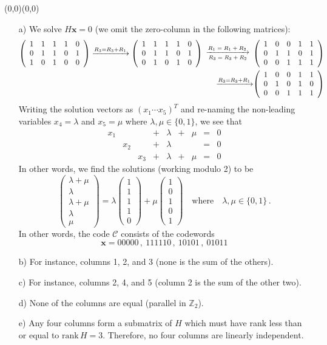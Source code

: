 \documentclass[11pt]{article}
\renewcommand{\vec}[1]{\mathbf{#1}}
\newcommand{\vc}[1]{\begin{pmatrix}#1\end{pmatrix}}
\newcommand{\pmat}[1]{{\left(\begin{array}{rrrrr}#1\end{array}\right)}}
\newcommand{\moveup}{\begin{picture}(0,0)(0,0)\end{picture}\vspace*{-8.15mm}}
\newcommand{\ra}[1]{\xrightarrow{#1}}
\newcommand{\dra}[2]{\begin{array}{c}\xrightarrow{\text{\scriptsize$#1$}}\\[-2mm]{\text{\scriptsize$#2$}}\end{array}}
\begin{document}
\bigskip
{}\moveup
\begin{itemize}
  \item[{a)}] We solve $H\vec{x} = 0$ (we omit the zero-column in the following matrices):
   \begin{align*}
    \pmat{
     1 & 1 & 1 & 1 & 0\\
     0 & 1 & 1 & 0 & 1\\
     1 & 0 & 1 & 0 & 0}
    \ra{R_3 = R_3 + R_1}
    \pmat{
     1 & 1 & 1 & 1 & 0\\
     0 & 1 & 1 & 0 & 1\\
     0 & 1 & 0 & 1 & 0}
    \dra{R_1 = R_1 + R_2}{R_3 = R_3 + R_2}
   &\pmat{
     1 & 0 & 0 & 1 & 1\\
     0 & 1 & 1 & 0 & 1\\
     0 & 0 & 1 & 1 & 1}\\
    \ra{R_3 = R_3 + R_1}
   &\pmat{
     1 & 0 & 0 & 1 & 1\\
     0 & 1 & 0 & 1 & 0\\
     0 & 0 & 1 & 1 & 1}
   \end{align*}
    Writing the solution vectors as $(x_1\cdots x_5)^T$
    and re-naming the non-leading variables $x_4 = \lambda$ and $x_5 = \mu$ where $\lambda,\mu\in\{0,1\}$,
    we see that
    \[
      \begin{array}{ccccccccc}
        x_1 &      &     &+&\lambda&+&\mu&=&0\\
            & x_2  &     &+&\lambda& &   &=&0\\
            &      & x_3 &+&\lambda&+&\mu&=&0
      \end{array}
    \]
    In other words, we find the solutions (working modulo 2) to be
    \[
        \vc{\lambda+\mu\\\lambda\\\lambda+\mu\\\lambda\\\mu}
      = \lambda\vc{1\\1\\1\\1\\0} + \mu\vc{1\\0\\1\\0\\1}\quad\text{where}\quad\lambda,\mu\in\{0,1\}\,.
    \]
    In other words,
    the code $\mathcal{C}$ consists of the codewords
    \[
      \mathbf{x} = 00000\,,\: 111110\,,\: 10101\,,\: 01011
    \]
 \item[{b)}] For instance, columns 1, 2, and 3 (none is the sum of the others).
 \item[{c)}] For instance, columns 2, 4, and 5 (column 2 is the sum of the other two).
 \item[{d)}] None of the columns are equal (parallel in $\mathbb{Z}_2$).
 \item[{e)}] Any four columns form a submatrix of $H$ which must have rank less than or equal to $\text{rank}\, H = 3$.
   Therefore, no four columns are linearly independent.
\end{itemize}
\end{document}
